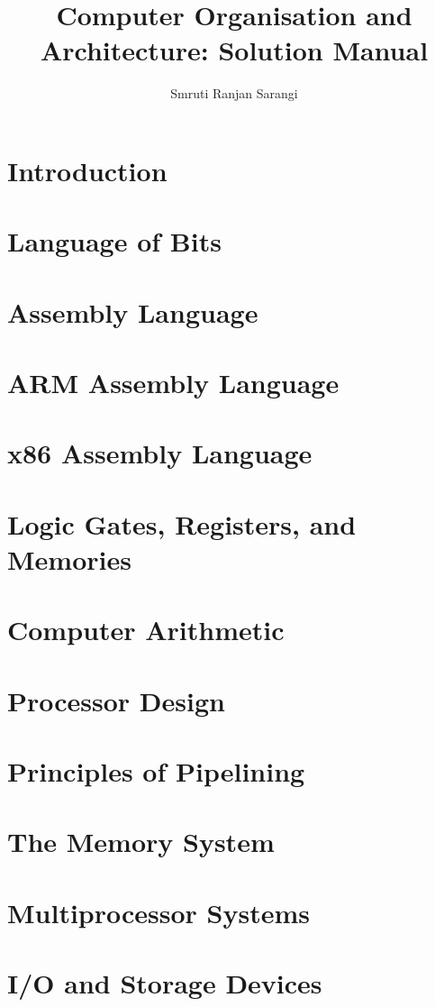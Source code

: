 \documentclass[dvipsnames, svgnames, x11names, table]{book}
\title{Computer Organisation and Architecture: Solution Manual}
\author{Smruti Ranjan Sarangi}
\begin{document}
\maketitle
\tableofcontents

\chapter{Introduction}


\chapter{Language of Bits}


\newpage
\chapter{Assembly Language}


\newpage
\chapter{ARM Assembly Language}


\newpage
\chapter{x86 Assembly Language}


\newpage
\chapter{Logic Gates, Registers, and Memories}


\newpage
\chapter{Computer Arithmetic}


\newpage
\chapter{Processor Design}


\newpage
\chapter{Principles of Pipelining}


\newpage
\chapter{The Memory System}


\newpage
\chapter{Multiprocessor Systems}


\newpage
\chapter{I/O and Storage Devices}

\end{document}
